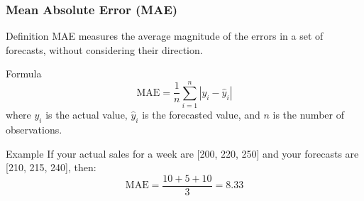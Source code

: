 \documentclass[aspectratio=169]{beamer}
\begin{document}
\begin{frame}[fragile]
    \frametitle{Mean Absolute Error (MAE)}
    \begin{block}{Definition}
        MAE measures the average magnitude of the errors in a set of forecasts, without considering their direction. 
    \end{block}
    \begin{block}{Formula}
        \begin{equation}
        \text{MAE} = \frac{1}{n} \sum_{i=1}^{n} |y_i - \hat{y}_i|
        \end{equation}
        where \( y_i \) is the actual value, \( \hat{y}_i \) is the forecasted value, and \( n \) is the number of observations.
    \end{block}
    \begin{block}{Example}
        If your actual sales for a week are [200, 220, 250] and your forecasts are [210, 215, 240], then:
        \begin{equation}
        \text{MAE} = \frac{10 + 5 + 10}{3} = 8.33
        \end{equation}
    \end{block}
\end{frame}
\end{document}
